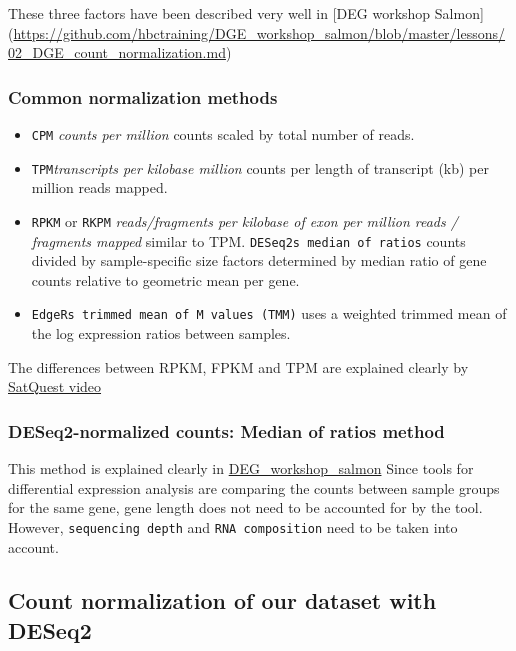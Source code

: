 \documentclass[
]{article}
\begin{document}
These three factors have been described very well in {[}DEG workshop
Salmon{]}
(\url{https://github.com/hbctraining/DGE_workshop_salmon/blob/master/lessons/02_DGE_count_normalization.md})

\subsubsection{Common normalization
methods}\label{common-normalization-methods}

\begin{itemize}
\item
  \texttt{CPM} \emph{counts per million} counts scaled by total number
  of reads.
\item
  \texttt{TPM}\emph{transcripts per kilobase million} counts per length
  of transcript (kb) per million reads mapped.
\item
  \texttt{RPKM} or \texttt{RKPM} \emph{reads/fragments per kilobase of
  exon per million reads / fragments mapped} similar to TPM.
  \texttt{DESeq2\textquotesingle{}s\ median\ of\ ratios} counts divided
  by sample-specific size factors determined by median ratio of gene
  counts relative to geometric mean per gene.
\item
  \texttt{EdgeR\textquotesingle{}s\ trimmed\ mean\ of\ M\ values\ (TMM)}
  uses a weighted trimmed mean of the log expression ratios between
  samples.
\end{itemize}

The differences between RPKM, FPKM and TPM are explained clearly by
\href{https://www.rna-seqblog.com/rpkm-fpkm-and-tpm-clearly-explained/}{SatQuest
video}

\subsubsection{DESeq2-normalized counts: Median of ratios
method}\label{deseq2-normalized-counts-median-of-ratios-method}

This method is explained clearly in
\href{https://github.com/hbctraining/DGE_workshop_salmon/blob/master/lessons/02_DGE_count_normalization.md}{DEG\_workshop\_salmon}
Since tools for differential expression analysis are comparing the
counts between sample groups for the same gene, gene length does not
need to be accounted for by the tool. However,
\texttt{sequencing\ depth} and \texttt{RNA\ composition} need to be
taken into account.

\subsection{Count normalization of our dataset with
DESeq2}\label{count-normalization-of-our-dataset-with-deseq2}
\end{document}
